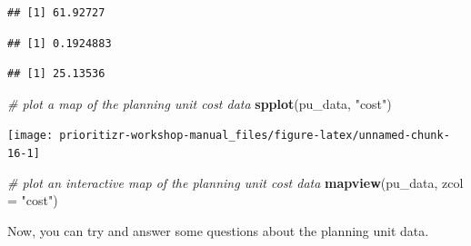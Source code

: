 \documentclass[12pt,]{book}
\newenvironment{Shaded}{\begin{snugshade}}{\end{snugshade}}
\newcommand{\KeywordTok}[1]{\textcolor[rgb]{0.13,0.29,0.53}{\textbf{#1}}}
\newcommand{\DataTypeTok}[1]{\textcolor[rgb]{0.13,0.29,0.53}{#1}}
\newcommand{\StringTok}[1]{\textcolor[rgb]{0.31,0.60,0.02}{#1}}
\newcommand{\CommentTok}[1]{\textcolor[rgb]{0.56,0.35,0.01}{\textit{#1}}}
\newcommand{\OperatorTok}[1]{\textcolor[rgb]{0.81,0.36,0.00}{\textbf{#1}}}
\newcommand{\NormalTok}[1]{#1}
\begin{document}
\begin{verbatim}
## [1] 61.92727
\end{verbatim}

\begin{Shaded}
\end{Shaded}

\begin{verbatim}
## [1] 0.1924883
\end{verbatim}

\begin{Shaded}
\end{Shaded}

\begin{verbatim}
## [1] 25.13536
\end{verbatim}

\begin{Shaded}
\begin{Highlighting}[]
\CommentTok{# plot a map of the planning unit cost data}
\KeywordTok{spplot}\NormalTok{(pu_data, }\StringTok{"cost"}\NormalTok{)}
\end{Highlighting}
\end{Shaded}

\begin{center}\texttt{[image: prioritizr-workshop-manual\_files/figure-latex/unnamed-chunk-16-1]} \end{center}

\begin{Shaded}
\begin{Highlighting}[]
\CommentTok{# plot an interactive map of the planning unit cost data}
\KeywordTok{mapview}\NormalTok{(pu_data, }\DataTypeTok{zcol =} \StringTok{"cost"}\NormalTok{)}
\end{Highlighting}
\end{Shaded}

Now, you can try and answer some questions about the planning unit data.
\end{document}
